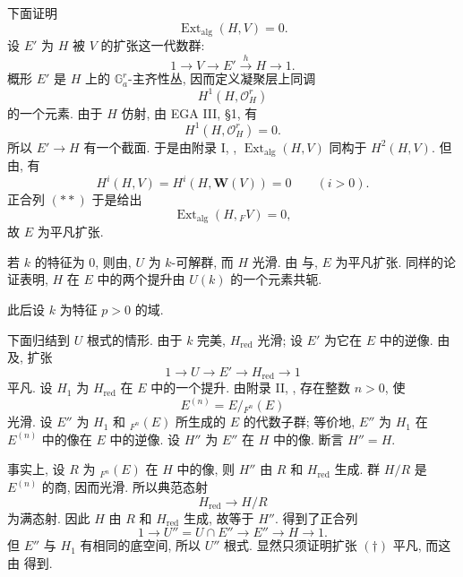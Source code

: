 下面证明
\[
  \operatorname{Ext}_{\mathrm{alg}}(H,V)=0.
\]
设 \(E'\) 为 \(H\) 被 \(V\) 的扩张这一代数群:
\[
  1\longrightarrow V\longrightarrow E'
    \xrightarrow{h}H\longrightarrow1.
\]
概形 \(E'\) 是 \(H\) 上的 \(\mathbb G_a^r\)-主齐性丛, 因而定义凝聚层上同调
\[
  H^1(H,\mathcal O_H^r)
\]
的一个元素. 由于 \(H\) 仿射, 由 EGA III, \S1, 有
\[
  H^1(H,\mathcal O_H^r)=0.
\]
所以 \(E'\to H\) 有一个截面.
于是由附录 I, ,
\(\operatorname{Ext}_{\mathrm{alg}}(H,V)\) 同构于 \(H^2(H,V)\). 但由,
有
\[
  H^i(H,V)=H^i(H,\mathbf W(V))=0\qquad(i>0).
\]
正合列 \((**)\) 于是给出
\[
  \operatorname{Ext}_{\mathrm{alg}}(H,{}_F V)=0,
\]
故 \(E\) 为平凡扩张.


若 \(k\) 的特征为 \(0\), 则由,
\(U\) 为 \(k\)-可解群, 而 \(H\) 光滑.
由 与,
\(E\) 为平凡扩张. 同样的论证表明, \(H\) 在 \(E\) 中的两个提升由 \(U(k)\) 的一个元素共轭.

此后设 \(k\) 为特征 \(p>0\) 的域.

下面归结到 \(U\) 根式的情形.
由于 \(k\) 完美, \(H_{\mathrm{red}}\) 光滑; 设 \(E'\) 为它在 \(E\) 中的逆像.
由
及, 扩张
\[
  1\longrightarrow U\longrightarrow E'
    \longrightarrow H_{\mathrm{red}}\longrightarrow1
\]
平凡. 设 \(H_1\) 为 \(H_{\mathrm{red}}\) 在 \(E\) 中的一个提升.
由附录 II, , 存在整数 \(n>0\), 使
\[
  E^{(n)}=E/{}_{F^n}(E)
\]
光滑. 设 \(E''\) 为 \(H_1\) 和 \({}_{F^n}(E)\) 所生成的 \(E\) 的代数子群;
等价地, \(E''\) 为 \(H_1\) 在 \(E^{(n)}\) 中的像在 \(E\) 中的逆像.
设 \(H''\) 为 \(E''\) 在 \(H\) 中的像. 断言 \(H''=H\).

事实上, 设 \(R\) 为 \({}_{F^n}(E)\) 在 \(H\) 中的像,
则 \(H''\) 由 \(R\) 和 \(H_{\mathrm{red}}\) 生成.
群 \(H/R\) 是 \(E^{(n)}\) 的商, 因而光滑.
所以典范态射
\[
  H_{\mathrm{red}}\longrightarrow H/R
\]
为满态射. 因此 \(H\) 由 \(R\) 和 \(H_{\mathrm{red}}\) 生成,
故等于 \(H''\). 得到了正合列
\[
  \tag{\(\dagger\)}\label{sga3:xvii:subsection:5-5:equation:dagger}
  1\longrightarrow U''=U\cap E''
    \longrightarrow E''\longrightarrow H\longrightarrow1.
\]
但 \(E''\) 与 \(H_1\) 有相同的底空间, 所以 \(U''\) 根式.
显然只须证明扩张 \((\dagger)\) 平凡, 而这由 得到.

